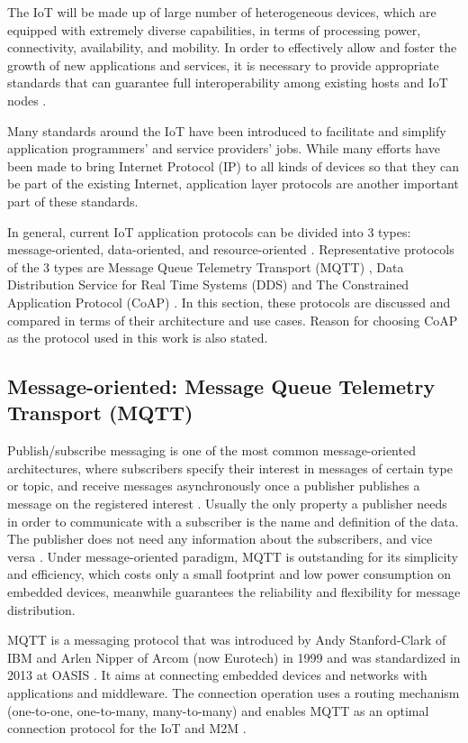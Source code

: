 The IoT will be made up of large number of heterogeneous devices, which are equipped with extremely diverse capabilities, in terms of processing power, connectivity, availability, and mobility. In order to effectively allow and foster the growth of new applications and services, it is necessary to provide appropriate standards that can guarantee full interoperability among existing hosts and IoT nodes \cite{cirani2015mjcoap}. 

Many standards around the IoT have been introduced to facilitate and simplify application programmers' and service providers' jobs. While many efforts have been made to bring Internet Protocol (IP) to all kinds of devices so that they can be part of the existing Internet, application layer protocols are another important part of these standards.

In general, current IoT application protocols can be divided into 3 types: message-oriented, data-oriented, and resource-oriented \cite{7396558}. Representative protocols of the 3 types are Message Queue Telemetry Transport (MQTT) \cite{mqtt_protocol}, Data Distribution Service for Real Time Systems (DDS) \cite{dds} and The Constrained Application Protocol (CoAP) \cite{coap_protocol}. In this section, these protocols are discussed and compared in terms of their architecture and use cases. 
Reason for choosing CoAP as the protocol used in this work is also stated. 

\subsection{Message-oriented:  Message Queue Telemetry Transport (MQTT)}
Publish/subscribe messaging is one of the most common message-oriented architectures, where subscribers specify their interest in messages of certain type or topic, and receive messages asynchronously once a publisher publishes a message on the registered interest \cite{6918928}. Usually the only property a publisher needs in order to communicate with a subscriber is the name and definition of the data. The publisher does not need any information about the subscribers, and vice versa \cite{pardo2005introduction}. Under message-oriented paradigm, MQTT is outstanding for its simplicity and efficiency, which costs only a small footprint and low power consumption on embedded devices, meanwhile guarantees the reliability and flexibility for message distribution.

MQTT is a messaging protocol that was introduced by Andy Stanford-Clark of IBM and Arlen Nipper of Arcom (now Eurotech) in 1999 and was standardized in 2013 at OASIS \cite{mqtt_protocol}. It aims at connecting embedded devices and networks with applications and middleware. The connection operation uses a routing mechanism (one-to-one, one-to-many, many-to-many) and enables MQTT as an optimal connection protocol for the IoT and M2M \cite{7123563}. 

